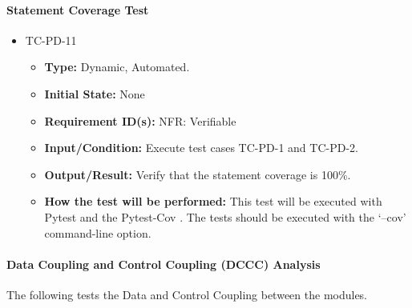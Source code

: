 \documentclass[12pt, titlepage]{article}
\begin{document}
\paragraph{Statement Coverage Test}

\begin{itemize}
\item{TC-PD-11\\}
\begin{itemize}

\item{\textbf{Type:}} Dynamic, Automated.
					
\item{\textbf{Initial State:}} None

\item{\textbf{Requirement ID(s):}} NFR: Verifiable
					
\item{\textbf{Input/Condition:}}  Execute test cases TC-PD-1 and TC-PD-2.
					
\item{\textbf{Output/Result:}} Verify that the statement coverage is 100\%.

\item{\textbf{How the test will be performed:}}  This test will be executed with Pytest \cite{Pytest} and 
the Pytest-Cov \cite{PyTest-Cov}. The tests should be executed with the `--cov' command-line option.

\end{itemize}
\end{itemize}

\paragraph{Data Coupling and Control Coupling (DCCC) Analysis}

The following tests the Data and Control Coupling between the modules. 
\end{document}
